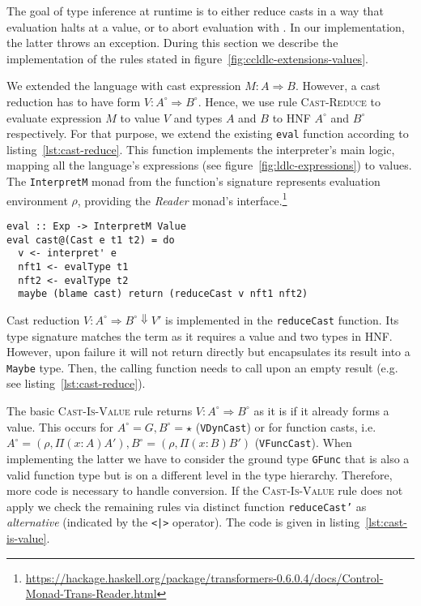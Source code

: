 The goal of type inference at runtime is to either reduce casts in a way that evaluation halts at a value, or to abort evaluation with \blame. In our implementation, the latter throws an exception. During this section we describe the implementation of the rules stated in figure~\ref{fig:ccldlc-extensions-values}.

We extended the language with cast expression $M : A \Rightarrow B$. However, a cast reduction has to have form $V : A^\circ \Rightarrow B^\circ$. Hence, we use rule \textsc{Cast-Reduce} to evaluate expression $M$ to value $V$ and types $A$ and $B$ to HNF $A^\circ$ and $B^\circ$ respectively. For that purpose, we extend the existing \texttt{eval} function according to listing~\ref{lst:cast-reduce}. This function implements the interpreter's main logic, mapping all the language's expressions (see figure~\ref{fig:ldlc-expressions}) to values. The \texttt{InterpretM} monad from the function's signature represents evaluation environment $\rho$, providing the \emph{Reader} monad's interface.\footnote{\url{https://hackage.haskell.org/package/transformers-0.6.0.4/docs/Control-Monad-Trans-Reader.html}}

\begin{lstlisting}[float,
  caption=Cast expression evaluation (\texttt{Interpreter.hs}),
  label=lst:cast-reduce]
eval :: Exp -> InterpretM Value
eval cast@(Cast e t1 t2) = do
  v <- interpret' e
  nft1 <- evalType t1
  nft2 <- evalType t2
  maybe (blame cast) return (reduceCast v nft1 nft2)
\end{lstlisting}

Cast reduction $V : A^\circ \Rightarrow B^\circ \Downarrow V'$ is implemented in the \texttt{reduceCast} function. Its type signature matches the term as it requires a value and two types in HNF. However, upon failure it will not return \blame directly but encapsulates its result into a \texttt{Maybe} type. Then, the calling function needs to call \blame upon an empty result (e.g. see listing~\ref{lst:cast-reduce}).

The basic \textsc{Cast-Is-Value} rule returns $V : A^\circ \Rightarrow B^\circ$ as it is if it already forms a value. This occurs for $A^\circ = G, B^\circ = \star$ (\texttt{VDynCast}) or for function casts, i.e. $A^\circ=(\rho, \Pi(x:A)A'), B^\circ=(\rho, \Pi(x:B)B')$ (\texttt{VFuncCast}). When implementing the latter we have to consider the ground type \texttt{GFunc} that is also a valid function type but is on a different level in the type hierarchy. Therefore, more code is necessary to handle conversion. If the \textsc{Cast-Is-Value} rule does not apply we check the remaining rules via distinct function \texttt{reduceCast'} as \emph{alternative} (indicated by the \texttt{<|>} operator). The code is given in listing~\ref{lst:cast-is-value}.

